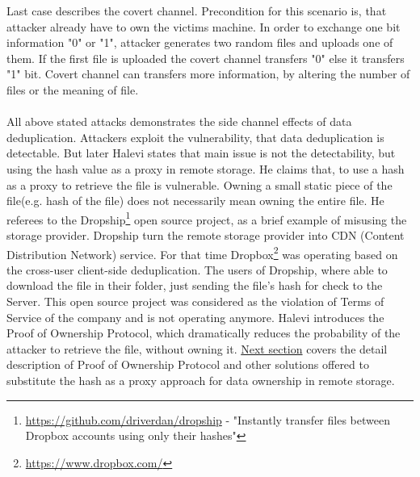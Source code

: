 \documentclass[12pt]{article}
\begin{document}
Last case describes the covert channel. Precondition for this scenario is, that attacker already have to own the victims machine. In order to exchange one bit information "0" or "1", attacker generates two random files  and uploads one of them. If the first file is uploaded the covert channel transfers "0" else it transfers "1" bit. Covert channel can transfers more information, by altering  the number of files or the meaning of file.\cite{Harnik}\\\\
All above stated attacks demonstrates the side channel effects of data deduplication. Attackers exploit the vulnerability, that data deduplication is detectable. But later Halevi states that main issue is not the detectability, but using the hash value as a proxy in remote storage.\cite{PoW} He claims that, to use a hash as a proxy to retrieve the file is vulnerable. Owning a small static piece of the file(e.g. hash of the file) does not necessarily mean owning the entire file. He referees to the Dropship\footnote{\url{https://github.com/driverdan/dropship} - "Instantly transfer files between Dropbox accounts using only their hashes"} open source project, as a brief example of misusing the storage provider. Dropship turn the remote storage  provider into CDN (Content Distribution Network) service. For that time Dropbox\footnote{\url{https://www.dropbox.com/}} was operating based on the cross-user client-side deduplication. The users of Dropship, where able to download the file in their folder, just sending the file’s hash for check to the Server. This open source project was considered as the violation of Terms of Service of the company and is not operating anymore. Halevi introduces the Proof of Ownership Protocol, which dramatically reduces the probability of the attacker to retrieve the file, without owning it. \hyperref[sec:4]{Next section} covers the detail description of Proof of Ownership Protocol and other solutions offered to substitute the hash as a proxy approach for data ownership in remote storage.\cite{PoW}
\end{document}
